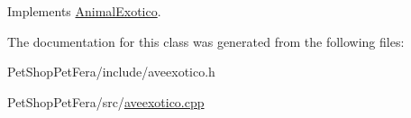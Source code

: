 Implements \mbox{\hyperlink{class_animal_exotico_a496013ecefb3cafb33537bb4022728e2}{Animal\+Exotico}}.



The documentation for this class was generated from the following files\+:\begin{DoxyCompactItemize}
\item 
Pet\+Shop\+Pet\+Fera/include/aveexotico.\+h\item 
Pet\+Shop\+Pet\+Fera/src/\mbox{\hyperlink{aveexotico_8cpp}{aveexotico.\+cpp}}\end{DoxyCompactItemize}
